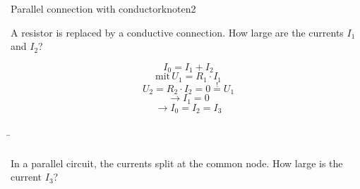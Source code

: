 \begin{frame}
{		
		
		\begin{expl}{Parallel connection with conductor}{knoten2}
			
			A resistor is replaced by a conductive connection.
			How large are the currents $I_1$ and $I_2$?\\
			
			\begin{center}
				
			\end{center}
			
			\begin{equation*}
				I_0=I_1+I_2
			\end{equation*}
			\begin{equation*}
				\mathrm{mit} \, U_1 = R_1 \cdot I_1
			\end{equation*}
			\begin{equation*}
				U_2 = R_2 \cdot I_2 =0 \stackrel{!}{=} U_1
			\end{equation*}
			\begin{equation*}
				\rightarrow I_1 = 0
			\end{equation*}
			\begin{equation*}
				\rightarrow I_0 = I_2 = I_3
			\end{equation*}
			
			
			
			
			
			
		\end{expl}
	}
	\b{
	
		\begin{columns}
			
			
			
			
			
			In a parallel circuit, the currents split at the common node.
			How large is the current $I_3$?	\\
			
			
			
			
			
		\end{columns}
		\begin{columns}
			\column[t]{0.6\textwidth}
			\vspace{-50pt}
			
			
			
			
			\pause
			

\end{columns}}
\end{frame}
